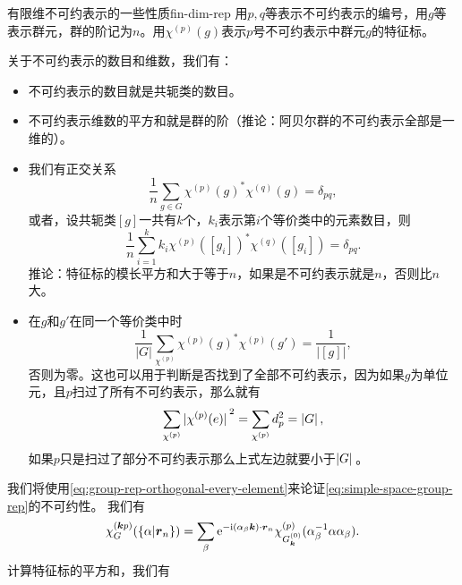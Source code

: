\begin{back}{有限维不可约表示的一些性质}{fin-dim-rep}
    用$p, q$等表示不可约表示的编号，用$g$等表示群元，群的阶记为$n$。用$\chi^{(p)}(g)$表示$p$号不可约表示中群元$g$的特征标。

    关于不可约表示的数目和维数，我们有： 
    \begin{itemize}
        \item 不可约表示的数目就是共轭类的数目。
        \item 不可约表示维数的平方和就是群的阶（推论：阿贝尔群的不可约表示全部是一维的）。
        \item 我们有正交关系
        \begin{equation}
            \frac{1}{n} \sum_{g \in G} \chi^{(p)}(g)^* \chi^{(q)}(g) = \delta_{pq},
            \label{eq:group-rep-orthogonal-every-element}
        \end{equation}
        或者，设共轭类$[g]$一共有$k$个，$k_i$表示第$i$个等价类中的元素数目，则
        \begin{equation}
            \frac{1}{n} \sum_{i=1}^k k_i \chi^{(p)}([g_i])^* \chi^{(q)}([g_i]) = \delta_{pq}.
        \end{equation}
        推论：特征标的模长平方和大于等于$n$，如果是不可约表示就是$n$，否则比$n$大。
        \item 在$g$和$g'$在同一个等价类中时
        \begin{equation}
            \frac{1}{|G|} \sum_{\chi^{(p)}} \chi^{(p)}(g)^* \chi^{(p)}(g') = \frac{1}{|[g]|},
        \end{equation}
        否则为零。这也可以用于判断是否找到了全部不可约表示，因为如果$g$为单位元，且$p$扫过了所有不可约表示，那么就有
        \begin{equation}
            \sum_{\chi^{(p)}} \abs*{ \chi^{(p)}(e)}^2 = \sum_{\chi^{(p)}} d_p^2 = \abs*{G},
            \label{eq:all-irreducible-reps-criteria}
        \end{equation}
        如果$p$只是扫过了部分不可约表示那么上式左边就要小于$\abs*{G}$。
    \end{itemize}
\end{back}
\noindent 我们将使用\eqref{eq:group-rep-orthogonal-every-element}来论证\eqref{eq:simple-space-group-rep}的不可约性。
我们有
\[
    \chi^{(\vb*{k} p)}_G(\{\alpha|\vb*{r}_n\}) = \sum_{\beta} \mathrm{e}^{- \mathrm{i} (\alpha_\beta \vb*{k}) \cdot \vb*{r}_n} \chi^{(p)}_{G^{(0)}_{\vb*{k}}} (\alpha^{-1}_\beta \alpha \alpha_\beta).
\]
计算特征标的平方和，我们有
